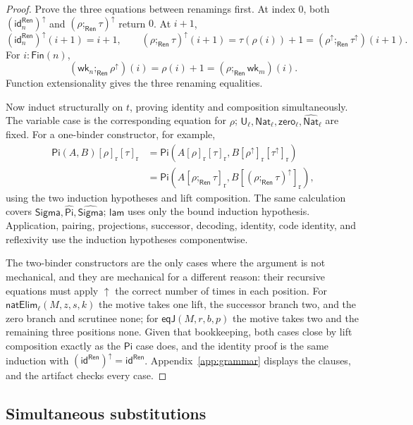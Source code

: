 \documentclass[10pt,reqno]{amsart}
\newcommand{\Fin}{\mathsf{Fin}}
\newcommand{\Ren}{\mathsf{Ren}}
\newcommand{\Sort}{\mathsf{U}}
\newcommand{\PiTy}{\mathsf{Pi}}
\newcommand{\SigmaTy}{\mathsf{Sigma}}
\newcommand{\Lam}{\mathsf{lam}}
\newcommand{\NatTy}{\mathsf{Nat}}
\newcommand{\Zero}{\mathsf{zero}}
\newcommand{\NatElim}{\mathsf{natElim}}
\newcommand{\CodeNat}{\widehat{\mathsf{Nat}}}
\newcommand{\CodePi}{\widehat{\mathsf{Pi}}}
\newcommand{\CodeSigma}{\widehat{\mathsf{Sigma}}}
\newcommand{\EqJ}{\mathsf{eqJ}}
\newcommand{\idren}{\mathsf{id}}
\newcommand{\wk}{\mathsf{wk}}
\newcommand{\lift}{\uparrow}
\begin{document}
\begin{proof}
Prove the three equations between renamings first.  At index \(0\), both
\((\idren^{\Ren}_n)^\lift\) and
\((\rho;_{\Ren}\tau)^\lift\) return \(0\).  At \(i+1\),
\[
 (\idren^{\Ren}_n)^\lift(i+1)=i+1,
\qquad
 (\rho;_{\Ren}\tau)^\lift(i+1)
   =\tau(\rho(i))+1
   =(\rho^\lift;_{\Ren}\tau^\lift)(i+1).
\]
For \(i:\Fin(n)\),
\[
 (\wk_n;_{\Ren}\rho^\lift)(i)=\rho(i)+1
   =(\rho;_{\Ren}\wk_m)(i).
\]
Function extensionality gives the three renaming equalities.

Now induct structurally on \(t\), proving identity and composition
simultaneously.  The variable case is the corresponding equation for
\(\rho\); \(\Sort_\ell,\NatTy_\ell,\Zero_\ell,\CodeNat_\ell\) are fixed.
For a one-binder constructor, for example,
\[
\begin{aligned}
\PiTy(A,B)[\rho]_{\mathrm r}[\tau]_{\mathrm r}
 &=\PiTy(A[\rho]_{\mathrm r}[\tau]_{\mathrm r},
          B[\rho^\lift]_{\mathrm r}[\tau^\lift]_{\mathrm r})\\
 &=\PiTy(A[\rho;_{\Ren}\tau]_{\mathrm r},
          B[(\rho;_{\Ren}\tau)^\lift]_{\mathrm r}),
\end{aligned}
\]
using the two induction hypotheses and lift composition.
The same calculation covers \(\SigmaTy,\CodePi,\CodeSigma\); \(\Lam\)
uses only the bound induction hypothesis.  Application, pairing,
projections, successor, decoding, identity, code identity, and reflexivity
use the induction hypotheses componentwise.

The two-binder constructors are the only cases where the argument is not
mechanical, and they are mechanical for a different reason: their recursive
equations must apply \(\lift\) the correct number of times in each position.
For \(\NatElim_\ell(M,z,s,k)\) the motive takes one lift, the successor branch
two, and the zero branch and scrutinee none; for \(\EqJ(M,r,b,p)\) the motive
takes two and the remaining three positions none.  Given that bookkeeping, both
cases close by lift composition exactly as the \(\PiTy\) case does, and the
identity proof is the same induction with
\((\idren^{\Ren})^\lift=\idren^{\Ren}\).  Appendix~\ref{app:grammar} displays
the clauses, and the artifact checks every case.
\end{proof}

\subsection{Simultaneous substitutions}
\end{document}
